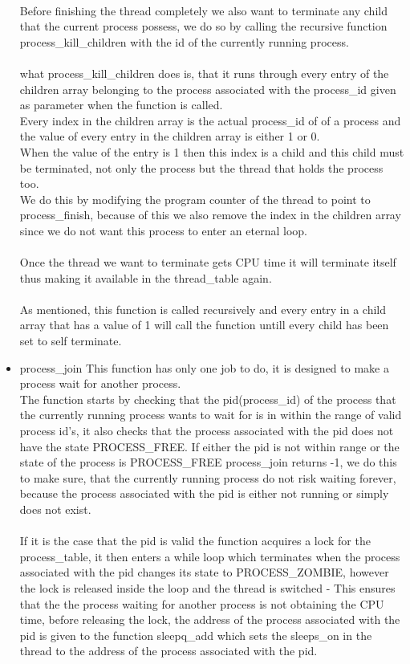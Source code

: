 \documentclass[a4paper,12pt,danish]{report}
\begin{document}
\begin{itemize}
  \\
  Before finishing the thread completely we also want to terminate any child that the current process possess, we do so by calling the recursive function process\_kill\_children with the id of the currently running process.
  \\
  \\
  what process\_kill\_children does is, that it runs through every entry of the children array belonging to the process associated with the process\_id given as parameter when the function is called.
  \\
  Every index in the children array is the actual process\_id of of a process and the value of every entry in the children array is either 1 or 0.
  \\
  When the value of the entry is 1 then this index is a child and this child must be terminated, not only the process but the thread that holds the process too.
  \\
  We do this by modifying the program counter of the thread to point to process\_finish, because of this we also remove the index in the children array since we do not want this process to enter an eternal loop.
  \\
  \\
  Once the thread we want to terminate gets CPU time it will terminate itself thus making it available in the thread\_table again.
  \\
  \\
  As mentioned, this function is called recursively and every entry in a child array that has a value of 1 will call the function untill every child has been set to self terminate.
  \item{process\_join}
  This function has only one job to do, it is designed to make a process wait for another process.
  \\
  The function starts by checking that the pid(process\_id) of the process that the currently running process wants to wait for is in within the range of valid process id's, it also checks that the process associated with the pid does not have the state PROCESS\_FREE.
  If either the pid is not within range or the state of the process is PROCESS\_FREE process\_join returns -1, we do this to make sure, that the currently running process do not risk waiting forever, because the process associated with the pid is either not running or simply does not exist.
  \\
  \\
  If it is the case that the pid is valid the function acquires a lock for the process\_table, it then enters a while loop which terminates when the process associated with the pid changes its state to PROCESS\_ZOMBIE, however the lock is released inside the loop and the thread is switched - This ensures that the the process waiting for another process is not obtaining the CPU time, before releasing the lock, the address of the process associated with the pid is given to the function sleepq\_add which sets the sleeps\_on in the thread to the address of the process associated with the pid.

\end{itemize}
\end{document}
